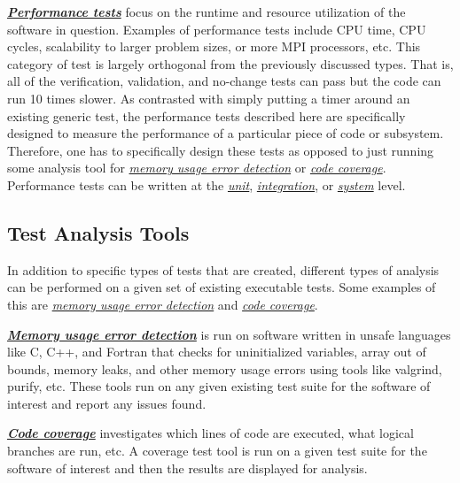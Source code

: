 \documentclass[]{article}
\begin{document}
\protect\hypertarget{id.aq6w7wcjeigv}{}{}\href{http://en.wikipedia.org/wiki/Software_performance_testing}{\textbf{\emph{Performance
tests}}} focus on the runtime and resource utilization of the software
in question. Examples of performance tests include CPU time, CPU cycles,
scalability to larger problem sizes, or more MPI processors, etc. This
category of test is largely orthogonal from the previously discussed
types. That is, all of the verification, validation, and no-change tests
can pass but the code can run 10 times slower. As contrasted with simply
putting a timer around an existing generic test, the performance tests
described here are specifically designed to measure the performance of a
particular piece of code or subsystem. Therefore, one has to
specifically design these tests as opposed to just running some analysis
tool for \protect\hyperlink{id.6n6lrjjln67m}{\emph{memory usage error
detection}} or \protect\hyperlink{id.sxuj9tgusjrf}{\emph{code
coverage}}. Performance tests can be written at the
\protect\hyperlink{id.5saje75168fl}{\emph{unit}},
\protect\hyperlink{id.j931ebv6xsmb}{\emph{integration}}, or
\protect\hyperlink{id.vllu2z1lvhtb}{\emph{system}} level.

\hypertarget{test-analysis-tools}{\subsection{Test Analysis
Tools}\label{test-analysis-tools}}

In addition to specific types of tests that are created, different types
of analysis can be performed on a given set of existing executable
tests. Some examples of this are
\protect\hyperlink{id.6n6lrjjln67m}{\emph{memory usage error detection}}
and \protect\hyperlink{id.sxuj9tgusjrf}{\emph{code coverage}}.

\protect\hypertarget{id.6n6lrjjln67m}{}{}\href{https://en.wikipedia.org/wiki/Memory_debugger}{\textbf{\emph{Memory
usage error detection}}} is run on software written in unsafe languages
like C, C++, and Fortran that checks for uninitialized variables, array
out of bounds, memory leaks, and other memory usage errors using tools
like valgrind, purify, etc. These tools run on any given existing test
suite for the software of interest and report any issues found.

\protect\hypertarget{id.sxuj9tgusjrf}{}{}\textbf{\href{http://en.wikipedia.org/wiki/Code_coverage}{\emph{Code
coverage}}} investigates which lines of code are executed, what logical
branches are run, etc. A coverage test tool is run on a given test suite
for the software of interest and then the results are displayed for
analysis.
\end{document}
